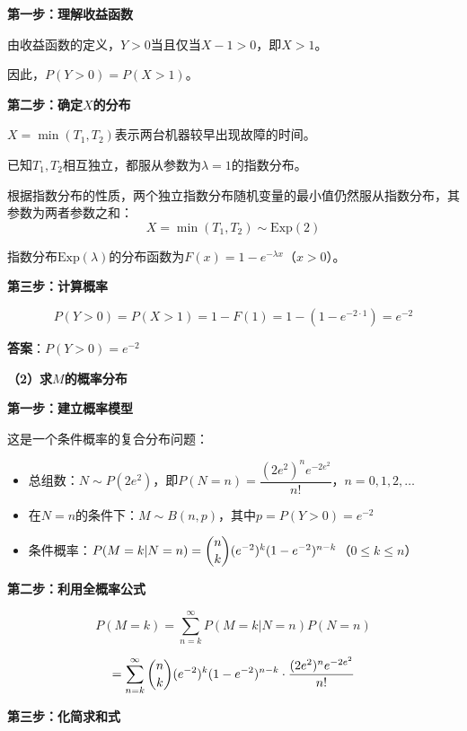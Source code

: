 \documentclass[standard]{ExBook}
\begin{document}
\begin{qitems}
\begin{bbox}
\begin{solution}
            \textbf{第一步：理解收益函数}
            
            由收益函数的定义，$Y>0$当且仅当$X-1>0$，即$X>1$。
            
            因此，$P(Y>0) = P(X>1)$。
            
            \textbf{第二步：确定$X$的分布}
            
            $X = \min(T_1, T_2)$表示两台机器较早出现故障的时间。
            
            已知$T_1, T_2$相互独立，都服从参数为$\lambda=1$的指数分布。
            
            根据指数分布的性质，两个独立指数分布随机变量的最小值仍然服从指数分布，其参数为两者参数之和：
            $$X = \min(T_1, T_2) \sim \text{Exp}(2)$$
            
            指数分布$\text{Exp}(\lambda)$的分布函数为$F(x) = 1 - e^{-\lambda x}$（$x>0$）。
            
            \textbf{第三步：计算概率}
            
            $$P(Y>0) = P(X>1) = 1 - F(1) = 1 - (1 - e^{-2 \cdot 1}) = e^{-2}$$
            
            \textbf{答案}：$\boxed{P(Y>0) = e^{-2}}$
            
            \textbf{（2）求$M$的概率分布}
            
            \textbf{第一步：建立概率模型}
            
            这是一个条件概率的复合分布问题：
            \begin{itemize}
                \item 总组数：$N \sim P(2e^2)$，即$P(N=n) = \dfrac{(2e^2)^n e^{-2e^2}}{n!}$，$n=0,1,2,\dots$
                \item 在$N=n$的条件下：$M \sim B(n, p)$，其中$p = P(Y>0) = e^{-2}$
                \item 条件概率：$P(M=k|N=n) = \dbinom{n}{k}(e^{-2})^k(1-e^{-2})^{n-k}$（$0 \le k \le n$）
            \end{itemize}
            
            \textbf{第二步：利用全概率公式}
            
            $$P(M=k) = \sum_{n=k}^{\infty} P(M=k|N=n)P(N=n)$$
            
            $$= \sum_{n=k}^{\infty} \dbinom{n}{k}(e^{-2})^k(1-e^{-2})^{n-k} \cdot \frac{(2e^2)^n e^{-2e^2}}{n!}$$
            
            \textbf{第三步：化简求和式}
            

\end{solution}
\end{bbox}
\end{qitems}
\end{document}
